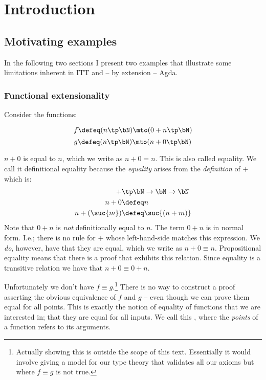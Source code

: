 \chapter{Introduction}
\section{Motivating examples}
%
In the following two sections I present two examples that illustrate some
limitations inherent in ITT and -- by extension -- Agda.
%
\subsection{Functional extensionality}
\label{sec:functional-extensionality}%
Consider the functions:
%
\begin{multicols}{2}
  \noindent
  \begin{equation*}
    f \defeq (n \tp \bN) \mto (0 + n \tp \bN)
  \end{equation*}
  \begin{equation*}
    g \defeq (n \tp \bN) \mto (n + 0 \tp \bN)
  \end{equation*}
\end{multicols}
%
$n + 0$ is  equal to $n$, which we write as $n + 0 = n$.
This is also called  equality. We call it definitional
equality because the \emph{equality} arises from the \emph{definition} of $+$
which is:
%
\begin{align*}
  +           & \tp \bN \to \bN \to \bN      \\
  n + 0       & \defeq n                   \\
  n + (\suc{m}) & \defeq \suc{(n + m)}
\end{align*}
%
Note that $0 + n$ is \emph{not} definitionally equal to $n$. The term $0 + n$ is in
normal form. I.e.; there is no rule for $+$ whose left-hand-side matches this
expression. We \emph{do}, however, have that they are 
equal, which we write as $n + 0 \equiv n$. Propositional equality means that
there is a proof that exhibits this relation. Since equality is a transitive
relation we have that $n + 0 \equiv 0 + n$.

Unfortunately we don't have $f \equiv g$.\footnote{Actually showing this is
outside the scope of this text. Essentially it would involve giving a model
for our type theory that validates all our axioms but where $f \equiv g$ is
not true.} There is no way to construct a proof asserting the obvious
equivalence of $f$ and $g$ -- even though we can prove them equal for all
points. This is exactly the notion of equality of functions that we are
interested in; that they are equal for all inputs. We call this
, where the \emph{points} of a function refers
to its arguments.

